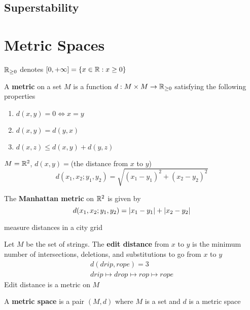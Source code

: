 \documentclass[11pt]{article}
\begin{document}
\subsection{Superstability}
\label{sec:org4e69c87}

\appendix
\section{Metric Spaces}
\label{sec:org103681f}
\(\mathbb{R}_{\ge 0}\) denotes \([0,+\infty]=\{x\in\mathbb{R}:x\ge 0\}\)
\begin{definition}[]
A \textbf{metric} on a set \(M\) is a function \(d:M\times M\to\mathbb{R}_{\ge 0}\) satisfying the following properties
\begin{enumerate}
\item \(d(x,y)=0\Leftrightarrow x=y\)
\item \(d(x,y)=d(y,x)\)
\item \(d(x,z)\le d(x,y)+d(y,z)\)
\end{enumerate}
\end{definition}

\begin{examplle}[]
\(M=\mathbb{R}^2\), \(d(x,y)=\)(the distance from \(x\) to \(y\))
\begin{equation*}
  d(x_1,x_2;y_1,y_2)=\sqrt{(x_1-y_1)^2+(x_2-y_2)^2}
\end{equation*}
\end{examplle}

\begin{examplle}[]
The \textbf{Manhattan metric} on \(\mathbb{R}^2\) is given by
\begin{equation*}
  d(x_1,x_2;y_1,y_2)=\abs{x_1-y_1}+\abs{x_2-y_2}
\end{equation*}

measure distances in a city grid
\end{examplle}

\begin{examplle}[]
Let \(M\) be the set of strings. The \textbf{edit distance} from \(x\) to \(y\) is the minimum number of
intersections, deletions, and substitutions to go from \(x\) to \(y\)
\begin{gather*}
  d(drip,rope)=3\\
  drip\mapsto drop\mapsto rop\mapsto rope
\end{gather*}
Edit distance is a metric on \(M\)
\end{examplle}

\begin{definition}[]
A \textbf{metric space} is a pair \((M,d)\) where \(M\) is a set and \(d\) is a metric space
\end{definition}
\end{document}
